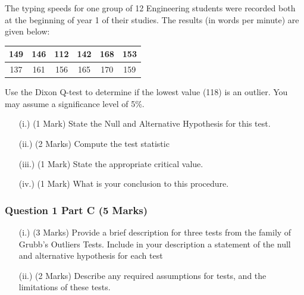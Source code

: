 \documentclass[a4paper,12pt]{article}
\begin{document}
	The typing speeds for one group of 12 Engineering students were recorded both at the beginning of year 1 of their studies. The results (in words per minute) are given below:
	
	\begin{center}
		\begin{tabular}{|c|c|c|c|c|c|}
			\hline
			149  & 146 & 112 & 142 & 168& 153\\ \hline
			137 & 161 & 156& 165&  170&  159
			\\ \hline
		\end{tabular}
	\end{center}
	Use the Dixon Q-test to determine if the lowest value (118) is an outlier. You may assume a significance level of 5\%.
	\begin{itemize}
		\item[(i.)](1 Mark)	State the Null and Alternative Hypothesis for this test.
		\item[(ii.)](2 Marks) Compute the test statistic
		\item[(iii.)](1 Mark) State the appropriate critical value.
		\item[(iv.)](1 Mark) What is your conclusion to this procedure.
	\end{itemize}
	\newpage
	\subsubsection*{Question 1 Part C (5 Marks)}
	
	\begin{itemize}
		\item[(i.)] (3 Marks) Provide a brief description for three tests from the family of Grubb's  Outliers Tests. Include in your description a statement of the null and alternative hypothesis for each test
		\item[(ii.)] (2 Marks) Describe any required assumptions for tests, and the limitations of these tests.
	\end{itemize}
	
	
	
	
\end{document}
